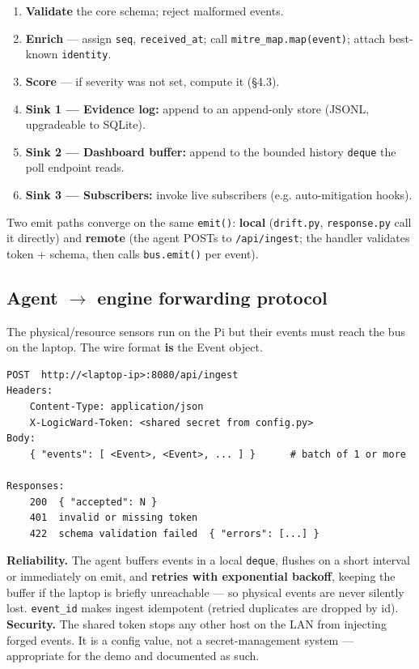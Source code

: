 \documentclass[11pt,a4paper]{article}
\newcommand{\code}[1]{\texttt{\small #1}}
\begin{document}
\begin{enumerate}[leftmargin=1.5em,itemsep=1pt]
  \item \textbf{Validate} the core schema; reject malformed events.
  \item \textbf{Enrich} --- assign \code{seq}, \code{received\_at}; call \code{mitre\_map.map(event)};
        attach best-known \code{identity}.
  \item \textbf{Score} --- if severity was not set, compute it (\S4.3).
  \item \textbf{Sink 1 --- Evidence log:} append to an append-only store (JSONL, upgradeable to SQLite).
  \item \textbf{Sink 2 --- Dashboard buffer:} append to the bounded history \code{deque} the poll endpoint reads.
  \item \textbf{Sink 3 --- Subscribers:} invoke live subscribers (e.g. auto-mitigation hooks).
\end{enumerate}

Two emit paths converge on the same \code{emit()}: \textbf{local} (\code{drift.py}, \code{response.py}
call it directly) and \textbf{remote} (the agent POSTs to \code{/api/ingest}; the handler validates
token + schema, then calls \code{bus.emit()} per event).

\subsection{Agent $\rightarrow$ engine forwarding protocol}
The physical/resource sensors run on the Pi but their events must reach the bus on the laptop. The
wire format \textbf{is} the Event object.

\begin{lstlisting}
POST  http://<laptop-ip>:8080/api/ingest
Headers:
    Content-Type: application/json
    X-LogicWard-Token: <shared secret from config.py>
Body:
    { "events": [ <Event>, <Event>, ... ] }      # batch of 1 or more

Responses:
    200  { "accepted": N }
    401  invalid or missing token
    422  schema validation failed  { "errors": [...] }
\end{lstlisting}

\begin{keybox}
\textbf{Reliability.} The agent buffers events in a local \code{deque}, flushes on a short interval
or immediately on emit, and \textbf{retries with exponential backoff}, keeping the buffer if the
laptop is briefly unreachable --- so physical events are never silently lost. \code{event\_id} makes
ingest idempotent (retried duplicates are dropped by id).\\[4pt]
\textbf{Security.} The shared token stops any other host on the LAN from injecting forged events. It
is a config value, not a secret-management system --- appropriate for the demo and documented as such.
\end{keybox}
\end{document}
